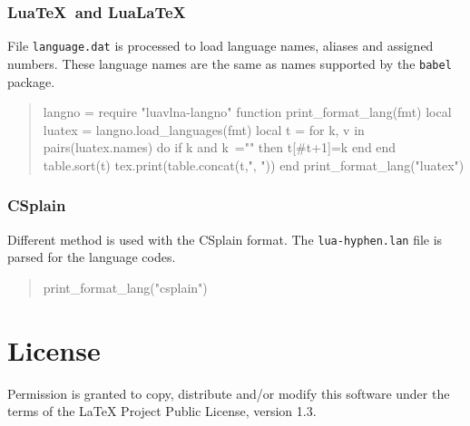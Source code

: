 \documentclass[12pt]{ltxdoc}
\begin{document}
\subsubsection{Lua\TeX\ and Lua\LaTeX}

File \verb|language.dat| is processed to load language names, aliases and assigned numbers. These language names are the same as names supported by the \verb|babel| package.

\begin{quotation}
  \small\noindent
\begin{luacode*}
  langno = require "luavlna-langno"
  function print_format_lang(fmt)
    local luatex = langno.load_languages(fmt)
    local t = {}
    for k, v in pairs(luatex.names) do
      if k and k~="" then
        t[#t+1]=k
      end
    end
    table.sort(t)
    tex.print(table.concat(t,", "))
  end
  print_format_lang("luatex")
\end{luacode*}
\end{quotation}

\subsubsection{CSplain}

Different method is used with the CSplain format. The \verb|lua-hyphen.lan| file is parsed for the language codes.

\begin{quotation}
  \small\noindent
  \begin{luacode*}
    print_format_lang("csplain")
  \end{luacode*}
\end{quotation}


\section{License}

Permission is granted to copy, distribute and/or modify this software
under the terms of the LaTeX Project Public License, version 1.3.
\end{document}
